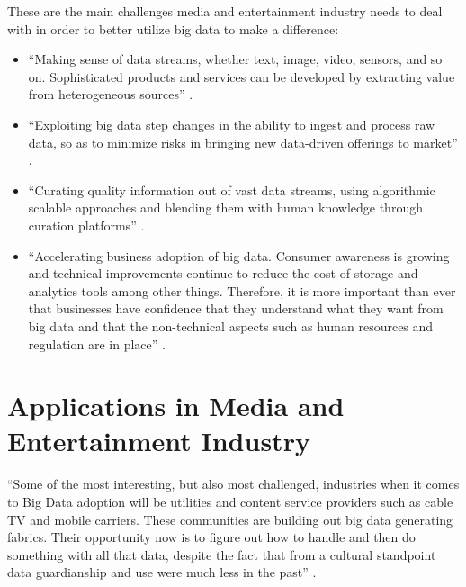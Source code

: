 \documentclass[sigconf]{acmart}
\begin{document}
These are the main challenges media and entertainment industry needs to deal with in order to better utilize big data to make a difference:
\begin{itemize}

  \item ``Making sense of data streams, whether text, image, video, sensors, and so on. Sophisticated products and services can be developed by extracting value from heterogeneous sources'' \cite{Lippell2016sectors}.
  
  \item ``Exploiting big data step changes in the ability to ingest and process raw data, so as to minimize risks in bringing new data-driven offerings to market'' \cite{Lippell2016sectors}.
  
  \item ``Curating quality information out of vast data streams, using algorithmic scalable approaches and blending them with human knowledge through curation platforms'' \cite{Lippell2016sectors}.
  
  \item ``Accelerating business adoption of big data. Consumer awareness is growing and technical improvements continue to reduce the cost of storage and analytics tools among other things. Therefore, it is more important than ever that businesses have confidence that they understand what they want from big data and that the non-technical aspects such as human resources and regulation are in place'' \cite{Lippell2016sectors}. 
  
\end{itemize}

\section{Applications in Media and Entertainment Industry}

``Some of the most interesting, but also most challenged, industries when it comes to Big Data adoption will be utilities and content service providers such as cable TV and mobile carriers. These communities are building out big data generating fabrics. Their opportunity now is to figure out how to handle and then do something with all that data, despite the fact that from a cultural standpoint data guardianship and use were much less in the past'' \cite{Villars2011care}.
\end{document}
